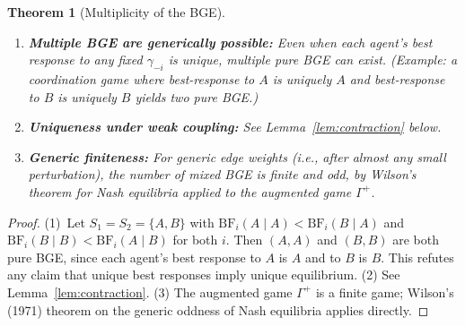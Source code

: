 \documentclass[12pt]{article}
\newtheorem{theorem}{Theorem}[section]
\theoremstyle{definition}
\theoremstyle{remark}
\newcommand{\BF}{\mathrm{BF}}              %
\begin{document}
\begin{theorem}[Multiplicity of the BGE]
\label{thm:bge_uniqueness}
\hfill
\begin{enumerate}
    \item \textbf{Multiple BGE are generically possible:} Even when each agent's best response to any fixed $\gamma_{-i}$ is unique, multiple pure BGE can exist.  (Example: a coordination game where best-response to $A$ is uniquely $A$ and best-response to $B$ is uniquely $B$ yields two pure BGE.)
    \item \textbf{Uniqueness under weak coupling:} See Lemma~\ref{lem:contraction} below.
    \item \textbf{Generic finiteness:} For generic edge weights (i.e., after almost any small perturbation), the number of mixed BGE is finite and odd, by Wilson's theorem for Nash equilibria applied to the augmented game $\Gamma^+$.
\end{enumerate}
\end{theorem}

\begin{proof}
(1)~Let $S_1 = S_2 = \{A, B\}$ with $\BF_i(A \mid A) < \BF_i(B \mid A)$ and $\BF_i(B \mid B) < \BF_i(A \mid B)$ for both $i$.  Then $(A, A)$ and $(B, B)$ are both pure BGE, since each agent's best response to $A$ is $A$ and to $B$ is $B$.  This refutes any claim that unique best responses imply unique equilibrium.  (2) See Lemma~\ref{lem:contraction}.  (3) The augmented game $\Gamma^+$ is a finite game; Wilson's (1971) theorem on the generic oddness of Nash equilibria applies directly.
\end{proof}
\end{document}
